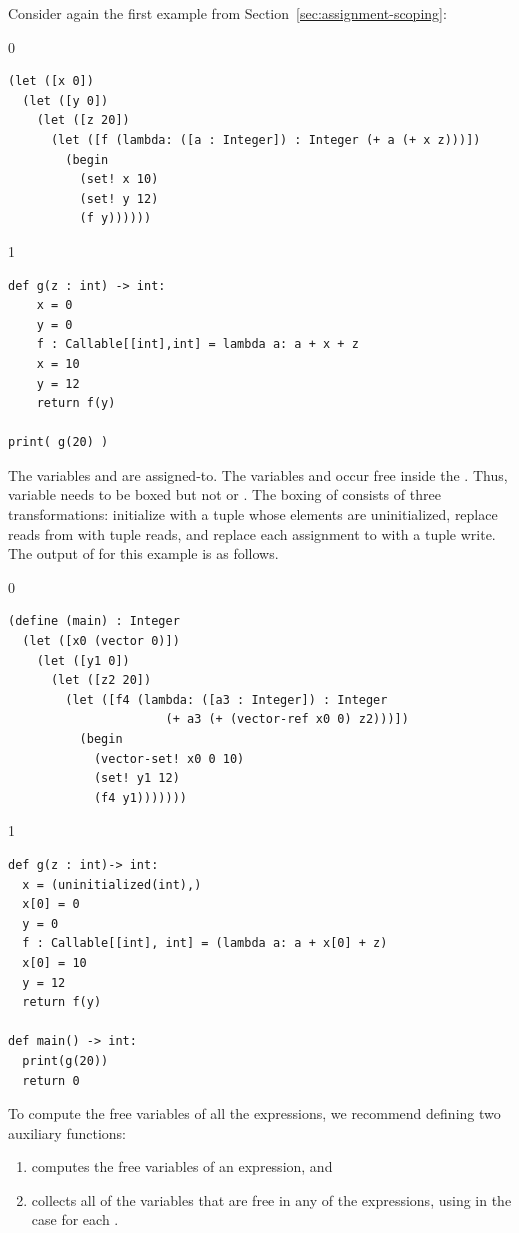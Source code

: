 \documentclass[7x10,nocrop]{TimesAPriori_MIT}%
\def\racketEd{0}
\def\pythonEd{1}
\def\edition{0}
\begin{document}
Consider again the first example from
Section~\ref{sec:assignment-scoping}:
%
{\if\edition\racketEd
\begin{lstlisting}
(let ([x 0])
  (let ([y 0])
    (let ([z 20])
      (let ([f (lambda: ([a : Integer]) : Integer (+ a (+ x z)))])
        (begin
          (set! x 10)
          (set! y 12)
          (f y))))))
\end{lstlisting}
\fi}
{\if\edition\pythonEd
\begin{lstlisting}
def g(z : int) -> int:
    x = 0
    y = 0  
    f : Callable[[int],int] = lambda a: a + x + z
    x = 10
    y = 12
    return f(y)

print( g(20) )
\end{lstlisting}
\fi}
%
\noindent The variables  and  are assigned-to.  The
variables  and  occur free inside the
. Thus, variable  needs to be boxed but not
 or .  The boxing of  consists of three
transformations: initialize  with a tuple whose elements are uninitialized,
replace reads from  with tuple reads, and replace each assignment to 
with a tuple write. The output of  for
this example is as follows.
%
{\if\edition\racketEd
\begin{lstlisting}
(define (main) : Integer
  (let ([x0 (vector 0)])
    (let ([y1 0])
      (let ([z2 20])
        (let ([f4 (lambda: ([a3 : Integer]) : Integer
                      (+ a3 (+ (vector-ref x0 0) z2)))])
          (begin 
            (vector-set! x0 0 10)
            (set! y1 12)
            (f4 y1)))))))
\end{lstlisting}
\fi}
%
{\if\edition\pythonEd
\begin{lstlisting}
def g(z : int)-> int:
  x = (uninitialized(int),)
  x[0] = 0
  y = 0
  f : Callable[[int], int] = (lambda a: a + x[0] + z)
  x[0] = 10
  y = 12
  return f(y)

def main() -> int:
  print(g(20))
  return 0
\end{lstlisting}
\fi}

To compute the free variables of all the  expressions, we
recommend defining two auxiliary functions:
\begin{enumerate}
\item {} computes the free variables of an expression, and
\item {} collects all of the variables that are
  free in any of the  expressions, using
   in the case for each .
\end{enumerate}
\end{document}
